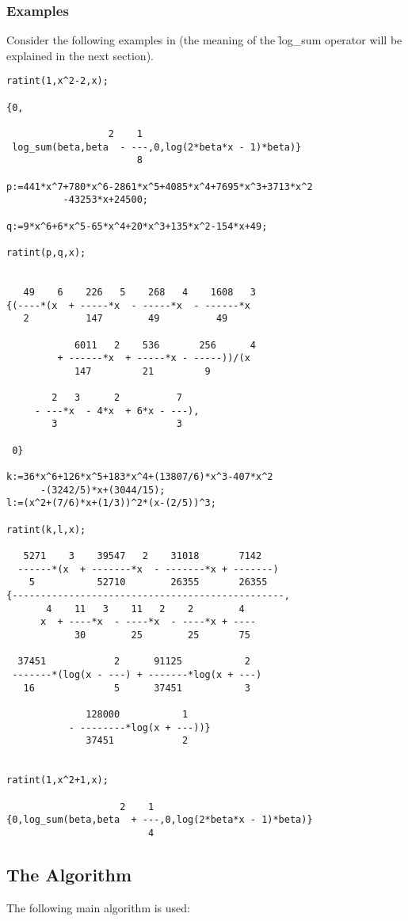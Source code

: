 \subsubsection{Examples}
Consider the following examples in \REDUCE (the meaning of the \f{log\_sum} operator will be explained in the next section).
\begin{verbatim}
ratint(1,x^2-2,x);

{0,

                  2    1
 log_sum(beta,beta  - ---,0,log(2*beta*x - 1)*beta)}
                       8

p:=441*x^7+780*x^6-2861*x^5+4085*x^4+7695*x^3+3713*x^2
          -43253*x+24500;

q:=9*x^6+6*x^5-65*x^4+20*x^3+135*x^2-154*x+49;

ratint(p,q,x);


   49    6    226   5    268   4    1608   3
{(----*(x  + -----*x  - -----*x  - ------*x
   2          147        49          49

            6011   2    536       256      4
         + ------*x  + -----*x - -----))/(x
            147         21         9

        2   3      2          7
     - ---*x  - 4*x  + 6*x - ---),
        3                     3

 0}

k:=36*x^6+126*x^5+183*x^4+(13807/6)*x^3-407*x^2
      -(3242/5)*x+(3044/15);
l:=(x^2+(7/6)*x+(1/3))^2*(x-(2/5))^3;

ratint(k,l,x);

   5271    3    39547   2    31018       7142
  ------*(x  + -------*x  - -------*x + -------)
    5           52710        26355       26355
{------------------------------------------------,
       4    11   3    11   2    2        4
      x  + ----*x  - ----*x  - ----*x + ----
            30        25        25       75

  37451            2      91125           2
 -------*(log(x - ---) + -------*log(x + ---)
   16              5      37451           3

              128000           1
           - --------*log(x + ---))}
              37451            2


ratint(1,x^2+1,x);

                    2    1
{0,log_sum(beta,beta  + ---,0,log(2*beta*x - 1)*beta)}
                         4
\end{verbatim}

\subsection{The Algorithm}
The following main algorithm is used:

